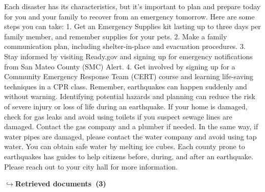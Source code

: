 \documentclass[a4paper,11pt]{article}
\begin{document}
\begin{agentbubble}
Each disaster has its characteristics, but it's important to plan and prepare today for you and your family to recover from an emergency tomorrow. Here are some steps you can take: 1. Get an Emergency Supplies kit lasting up to three days per family member, and remember supplies for your pets. 2. Make a family communication plan, including shelter-in-place and evacuation procedures. 3. Stay informed by visiting Ready.gov and signing up for emergency notifications from San Mateo County (SMC) Alert. 4. Get involved by signing up for a Community Emergency Response Team (CERT) course and learning life-saving techniques in a CPR class. Remember, earthquakes can happen suddenly and without warning. Identifying potential hazards and planning can reduce the risk of severe injury or loss of life during an earthquake. If your home is damaged, check for gas leaks and avoid using toilets if you suspect sewage lines are damaged. Contact the gas company and a plumber if needed. In the same way, if water pipes are damaged, please contact the water company and avoid using tap water. You can obtain safe water by melting ice cubes. Each county prone to earthquakes has guides to help citizens before, during, and after an earthquake. Please reach out to your city hall for more information.
\end{agentbubble}
\noindent\hfill{\footnotesize\textcolor{doccolor}{\textbf{$\hookrightarrow$\enspace Retrieved documents~(3)}}}
\end{document}
